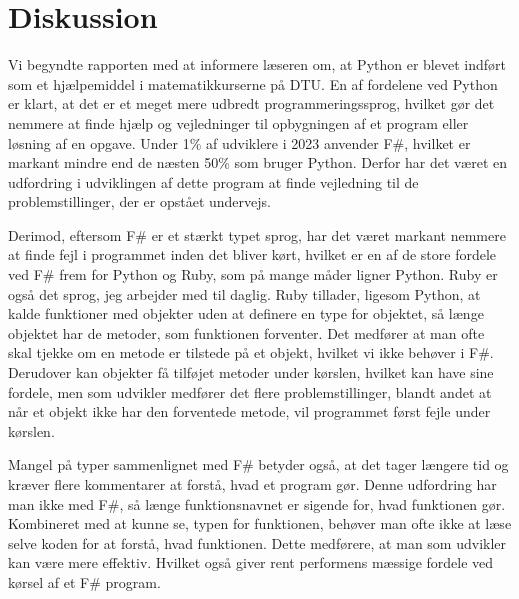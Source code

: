 \documentclass{article}
\newcommand{\newchapter}{
    \cleardoublepage
    \ifthenelse{\isodd{\value{page}}}{}{\hbox{}\newpage}
}
\begin{document}

\pagestyle{plain}
\tableofcontents
\newchapter


\newchapter

\newchapter

\newchapter

\newchapter

\newchapter


\section{Diskussion}
Vi begyndte rapporten med at informere læseren om, at Python er blevet indført som et hjælpemiddel i matematikkurserne på DTU. En af fordelene ved Python er klart, at det er et meget mere udbredt programmeringssprog, hvilket gør det nemmere at finde hjælp og vejledninger til opbygningen af et program eller løsning af en opgave. Under 1\% af udviklere i 2023 anvender F\#, hvilket er markant mindre end de næsten 50\% som bruger Python. Derfor har det været en udfordring i udviklingen af dette program at finde vejledning til de problemstillinger, der er opstået undervejs.

Derimod, eftersom F\# er et stærkt typet sprog, har det været markant nemmere at finde fejl i programmet inden det bliver kørt, hvilket er en af de store fordele ved F\# frem for Python og Ruby, som på mange måder ligner Python. Ruby er også det sprog, jeg arbejder med til daglig. Ruby tillader, ligesom Python, at kalde funktioner med objekter uden at definere en type for objektet, så længe objektet har de metoder, som funktionen forventer. Det medfører at man ofte skal tjekke om en metode er tilstede på et objekt, hvilket vi ikke behøver i F\#. Derudover kan objekter få tilføjet metoder under kørslen, hvilket kan have sine fordele, men som udvikler medfører det flere problemstillinger, blandt andet at når et objekt ikke har den forventede metode, vil programmet først fejle under kørslen. 

Mangel på typer sammenlignet med F\# betyder også, at det tager længere tid og kræver flere kommentarer at forstå, hvad et program gør. Denne udfordring har man ikke med F\#, så længe funktionsnavnet er sigende for, hvad funktionen gør. Kombineret med at kunne se, typen for funktionen, behøver man ofte ikke at læse selve koden for at forstå, hvad funktionen. Dette medførere, at man som udvikler kan være mere effektiv. Hvilket også giver rent performens mæssige fordele ved kørsel af et F\# program. 
\end{document}
